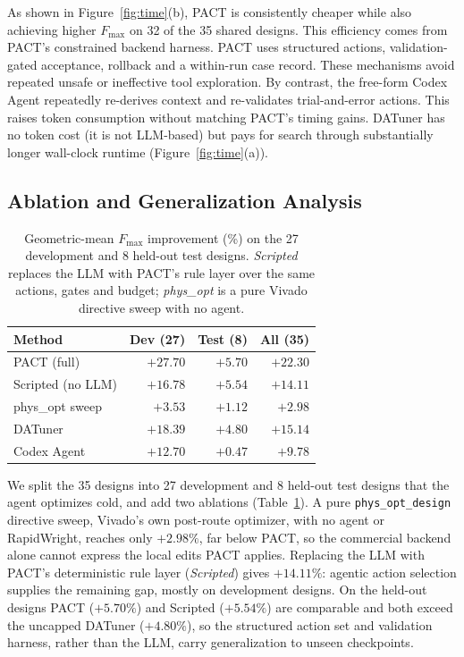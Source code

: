 \documentclass[conference]{IEEEtran}
\begin{document}
As shown in Figure~\ref{fig:time}(b), PACT is consistently cheaper while also achieving higher $F_{\max}$ on 32 of the 35 shared designs. This efficiency comes from PACT's constrained backend harness. PACT uses structured actions, validation-gated acceptance, rollback and a within-run case record. These mechanisms avoid repeated unsafe or ineffective tool exploration. By contrast, the free-form Codex Agent repeatedly re-derives context and re-validates trial-and-error actions. This raises token consumption without matching PACT's timing gains. DATuner has no token cost (it is not LLM-based) but pays for search through substantially longer wall-clock runtime (Figure~\ref{fig:time}(a)).

\subsection{Ablation and Generalization Analysis}
\label{sec:ablation}

\begin{table}[t]
\centering
\caption{Geometric-mean $F_{\max}$ improvement (\%) on the 27
development and 8 held-out test designs. \emph{Scripted} replaces the
LLM with PACT's rule layer over the same actions, gates and budget;
\emph{phys\_opt} is a pure Vivado directive sweep with no agent.}
\label{tab:ablation}
\begin{tabular}{lrrr}
\toprule
Method & Dev (27) & Test (8) & All (35) \\
\midrule
PACT (full)            & $\mathbf{+27.70}$ & $+5.70$ & $\mathbf{+22.30}$ \\
\;\;Scripted (no LLM)  & $+16.78$ & $+5.54$ & $+14.11$ \\
\;\;phys\_opt sweep    & $+3.53$  & $+1.12$ & $+2.98$  \\
DATuner                & $+18.39$ & $+4.80$ & $+15.14$ \\
Codex Agent            & $+12.70$ & $+0.47$ & $+9.78$  \\
\bottomrule
\end{tabular}
\end{table}

We split the 35 designs into 27 development and 8 held-out test designs
that the agent optimizes cold, and add two ablations
(Table~\ref{tab:ablation}). A pure \texttt{phys\_opt\_design} directive
sweep, Vivado's own post-route optimizer, with no agent or
RapidWright, reaches only $+2.98\%$, far below PACT, so the commercial
backend alone cannot express the local edits PACT applies. Replacing
the LLM with PACT's deterministic rule layer (\emph{Scripted}) gives
$+14.11\%$: agentic action selection supplies the remaining gap, mostly
on development designs. On the held-out designs PACT ($+5.70\%$) and
Scripted ($+5.54\%$) are comparable and both exceed the uncapped
DATuner ($+4.80\%$), so the structured action set and validation
harness, rather than the LLM, carry generalization to unseen
checkpoints.
\end{document}
